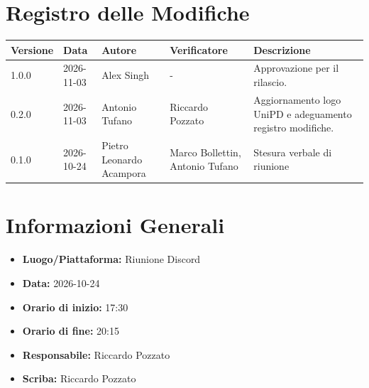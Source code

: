 \documentclass[a4paper, 11pt]{article}
\begin{document}
\section*{Registro delle Modifiche}
\vspace{0.5cm}
\begin{center}
\renewcommand{\arraystretch}{1.5}
\begin{tabularx}{\textwidth}{|l|l|>{\raggedright\arraybackslash}p{3.5cm}|>{\raggedright\arraybackslash}p{3.5cm}|X|}
\hline
\textbf{Versione} & \textbf{Data} & \textbf{Autore} & \textbf{Verificatore} & \textbf{Descrizione} \\ \hline
1.0.0 & 2026-11-03 & Alex Singh & - & Approvazione per il rilascio. \\ \hline
0.2.0 & 2026-11-03 & Antonio Tufano & Riccardo Pozzato & Aggiornamento logo UniPD e adeguamento registro modifiche. \\ \hline
0.1.0 & 2026-10-24 & Pietro Leonardo Acampora & Marco Bollettin, Antonio Tufano & Stesura verbale di riunione \\ \hline

\end{tabularx}
\end{center}

\newpage

\tableofcontents
\newpage
\section{Informazioni Generali}
\begin{itemize}
    \item \textbf{Luogo/Piattaforma:} Riunione Discord
    \item \textbf{Data:} 2026-10-24
    \item \textbf{Orario di inizio:} 17:30
    \item \textbf{Orario di fine:} 20:15
    \item \textbf{Responsabile:} Riccardo Pozzato
    \item \textbf{Scriba:} Riccardo Pozzato
\end{itemize}
\end{document}
